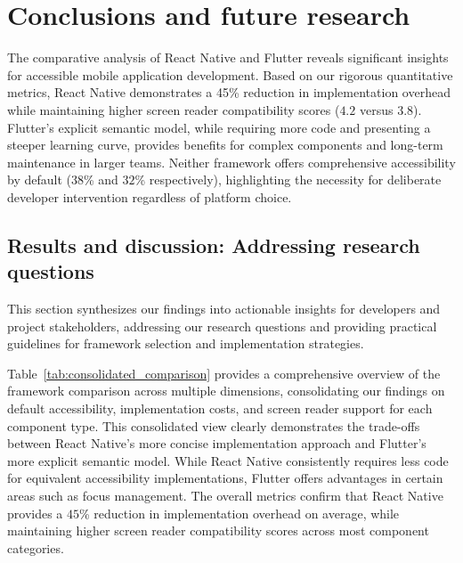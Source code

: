\chapter{Conclusions and future research}
\label{chap:conclusions}

The comparative analysis of React Native and Flutter reveals significant insights for accessible mobile application development. Based on our rigorous quantitative metrics, React Native demonstrates a 45\% reduction in implementation overhead while maintaining higher screen reader compatibility scores ($4.2$ versus $3.8$). Flutter's explicit semantic model, while requiring more code and presenting a steeper learning curve, provides benefits for complex components and long-term maintenance in larger teams. Neither framework offers comprehensive accessibility by default ($38$\% and $32$\% respectively), highlighting the necessity for deliberate developer intervention regardless of platform choice.

\section{Results and discussion: Addressing research questions}
\label{sec:results-discussion}

This section synthesizes our findings into actionable insights for developers and project stakeholders, addressing our research questions and providing practical guidelines for framework selection and implementation strategies.

Table~\ref{tab:consolidated_comparison} provides a comprehensive overview of the framework comparison across multiple dimensions, consolidating our findings on default accessibility, implementation costs, and screen reader support for each component type. This consolidated view clearly demonstrates the trade-offs between React Native's more concise implementation approach and Flutter's more explicit semantic model. While React Native consistently requires less code for equivalent accessibility implementations, Flutter offers advantages in certain areas such as focus management. The overall metrics confirm that React Native provides a $45$\% reduction in implementation overhead on average, while maintaining higher screen reader compatibility scores across most component categories.

